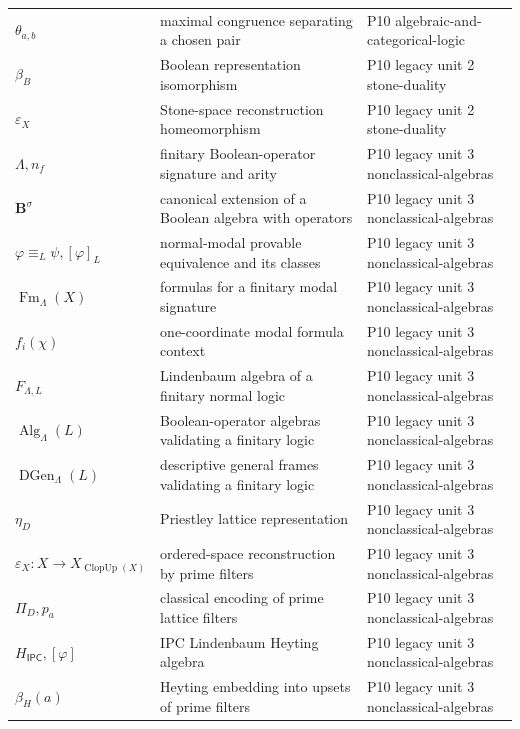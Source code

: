 \begin{longtable}{@{}p{}p{}p{}@{}}
\(\theta_{a,b}\) & maximal congruence separating a chosen pair & P10 algebraic-\allowbreak{}and-\allowbreak{}categorical-\allowbreak{}logic \\
\(\beta_B\) & Boolean representation isomorphism & P10 legacy unit 2 stone-\allowbreak{}duality \\
\(\varepsilon_X\) & Stone-space reconstruction homeomorphism & P10 legacy unit 2 stone-\allowbreak{}duality \\
\(\Lambda,\allowbreak n_f\) & finitary Boolean-operator signature and arity & P10 legacy unit 3 nonclassical-\allowbreak{}algebras \\
\(\mathbf B^\sigma\) & canonical extension of a Boolean algebra with operators & P10 legacy unit 3 nonclassical-\allowbreak{}algebras \\
\(\varphi\equiv_L\psi,\allowbreak [\varphi]_L\) & normal-modal provable equivalence and its classes & P10 legacy unit 3 nonclassical-\allowbreak{}algebras \\
\(\operatorname{Fm}_\Lambda(X)\) & formulas for a finitary modal signature & P10 legacy unit 3 nonclassical-\allowbreak{}algebras \\
\(f_i(\chi)\) & one-coordinate modal formula context & P10 legacy unit 3 nonclassical-\allowbreak{}algebras \\
\(F_{\Lambda,L}\) & Lindenbaum algebra of a finitary normal logic & P10 legacy unit 3 nonclassical-\allowbreak{}algebras \\
\(\operatorname{Alg}_\Lambda(L)\) & Boolean-operator algebras validating a finitary logic & P10 legacy unit 3 nonclassical-\allowbreak{}algebras \\
\(\operatorname{DGen}_\Lambda(L)\) & descriptive general frames validating a finitary logic & P10 legacy unit 3 nonclassical-\allowbreak{}algebras \\
\(\eta_D\) & Priestley lattice representation & P10 legacy unit 3 nonclassical-\allowbreak{}algebras \\
\(\varepsilon_X:X\to X_{\operatorname{ClopUp}(X)}\) & ordered-space reconstruction by prime filters & P10 legacy unit 3 nonclassical-\allowbreak{}algebras \\
\(\Pi_D,\allowbreak p_a\) & classical encoding of prime lattice filters & P10 legacy unit 3 nonclassical-\allowbreak{}algebras \\
\(H_{\mathsf{IPC}},\allowbreak [\varphi]\) & IPC Lindenbaum Heyting algebra & P10 legacy unit 3 nonclassical-\allowbreak{}algebras \\
\(\beta_H(a)\) & Heyting embedding into upsets of prime filters & P10 legacy unit 3 nonclassical-\allowbreak{}algebras \\

\end{longtable}
